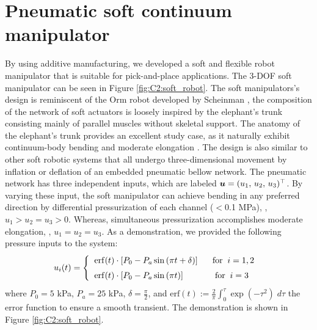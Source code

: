 \section{Pneumatic soft continuum manipulator}
By using additive manufacturing, we developed a soft and flexible robot manipulator that is suitable for pick-and-place applications. The 3-DOF soft manipulator can be seen in Figure \ref{fig:C2:soft_robot}. The soft manipulators's design is reminiscent of the Orm robot developed by Scheinman \cite{BibEntryOrm2019Sep}, the composition of the network of soft actuators is loosely inspired by the elephant's trunk consisting mainly of parallel muscles without skeletal support. The anatomy of the elephant's trunk provides an excellent study case, as it naturally exhibit continuum-body bending and moderate elongation \cite{Falkenhahn2015,Jones2006,Tatlicioglu2007}. The design is also similar to other soft robotic systems \cite{Suzumori1991,Falkenhahn2015,Drotman2017} that all undergo three-dimensional movement by inflation or deflation of an embedded pneumatic bellow network. The pneumatic network has three independent inputs, which are labeled ${\boldsymbol{u}} = (u_1,\,u_2,\,u_3)^\top$. By varying these input, the soft manipulator can achieve bending in any preferred direction by differential pressurization of each channel ($<$0.1 \si{\mega \pascal}), \eg, $u_1 > u_2 = u_3 > 0$. Whereas, simultaneous pressurization accomplishes moderate elongation, \ie, $u_1 = u_2 = u_3$. As a demonstration, we provided the following pressure inputs to the system:
%
\begin{align}
  u_i(t) = \begin{cases}
          \;\;\textup{\textrm{erf}}(t)\cdot \left[P_0 - P_a\sin\left(\pi t + \delta\right)\right] \quad\;\; \textrm{for}\;\; i = 1,2 \\[0.35em]
          \;\;\textup{\textrm{erf}}(t)\cdot \left[P_0 - P_a\sin\left(\pi t \right)\right] \quad\quad\quad\;\; \textrm{for}\;\; i = 3\;\ \\
           \end{cases}
\end{align}
%
where $P_0 = 5$ \si{\kilo \pascal}, $P_a = 25$ \si{\kilo \pascal}, $\delta = \frac{\pi}{2}$, and $\textrm{erf}(t) := \frac{2}{\pi}\int_0^\tau \exp(-\tau^2) \; d\tau$   the error function to ensure a smooth transient. The demonstration is shown in Figure \ref{fig:C2:soft_robot}.

